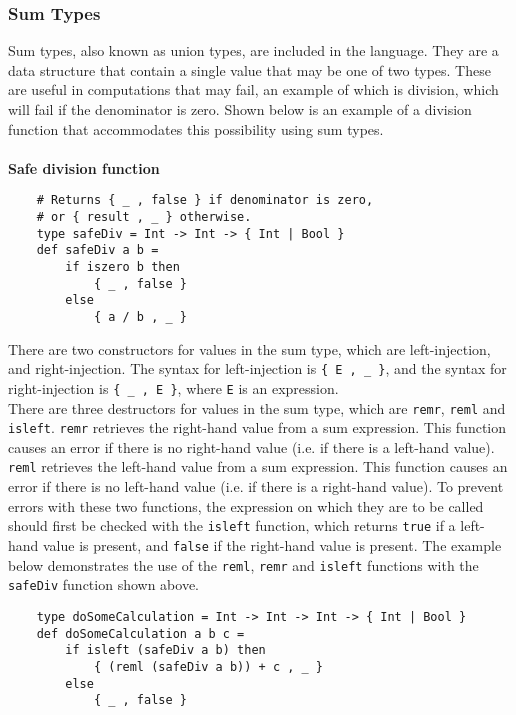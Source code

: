\documentclass{article}
\begin{document}
\subsubsection{Sum Types}
Sum types, also known as union types, are included in the language. They are a data structure that contain a single value that may be one of two types. These are useful in computations that may fail, an example of which is division, which will fail if the denominator is zero. Shown below is an example of a division function that accommodates this possibility using sum types.
\\\\
\indent\textbf{Safe division function}
\begin{verbatim}
    # Returns { _ , false } if denominator is zero,
    # or { result , _ } otherwise.
    type safeDiv = Int -> Int -> { Int | Bool }
    def safeDiv a b =
        if iszero b then
            { _ , false }
        else
            { a / b , _ }
\end{verbatim}
There are two constructors for values in the sum type, which are left-injection, and right-injection. The syntax for left-injection is \texttt{\{ E , \_ \}}, and the syntax for right-injection is \texttt{\{ \_ , E \}}, where \texttt{E} is an expression.
\\\indent There are three destructors for values in the sum type, which are \texttt{remr}, \texttt{reml} and \texttt{isleft}. \texttt{remr} retrieves the right-hand value from a sum expression. This function causes an error if there is no right-hand value (i.e. if there is a left-hand value). \texttt{reml} retrieves the left-hand value from a sum expression. This function causes an error if there is no left-hand value (i.e. if there is a right-hand value). To prevent errors with these two functions, the expression on which they are to be called should first be checked with the \texttt{isleft} function, which returns \texttt{true} if a left-hand value is present, and \texttt{false} if the right-hand value is present. The example below demonstrates the use of the \texttt{reml}, \texttt{remr} and \texttt{isleft} functions with the \texttt{safeDiv} function shown above.
\begin{verbatim}
    type doSomeCalculation = Int -> Int -> Int -> { Int | Bool }
    def doSomeCalculation a b c =
        if isleft (safeDiv a b) then
            { (reml (safeDiv a b)) + c , _ }
        else
            { _ , false }
\end{verbatim}
\end{document}
